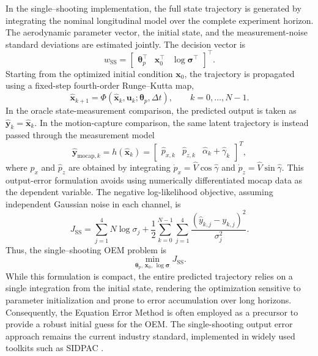 \documentclass[11pt]{article}
\begin{document}
In the single--shooting implementation, the full state trajectory is generated by
integrating the nominal longitudinal model over the complete experiment horizon.
The aerodynamic parameter vector, the initial state, and the measurement-noise
standard deviations are estimated jointly. The decision vector is
\[
    w_{\mathrm{SS}}
    =
    \begin{bmatrix}
        \boldsymbol{\theta}_p^\top &
        \mathbf{x}_0^\top &
        \log\boldsymbol{\sigma}^\top
    \end{bmatrix}^{\!\top}.
\]
Starting from the optimized initial condition $\mathbf{x}_0$, the trajectory is
propagated using a fixed-step fourth-order Runge--Kutta map,
\[
    \hat{\mathbf{x}}_{k+1}
    =
    \Phi(\hat{\mathbf{x}}_k,\mathbf{u}_k;\boldsymbol{\theta}_p,\Delta t),
    \qquad k=0,\ldots,N-1.
\]
In the oracle state-measurement comparison, the predicted output is
taken as $\hat{\mathbf{y}}_k=\hat{\mathbf{x}}_k$. In the motion-capture comparison,
the same latent trajectory is instead passed through the measurement model
\[
\hat{\mathbf{y}}_{\mathrm{mocap},k}
=h(\hat{\mathbf{x}}_k)
=
\begin{bmatrix}
\hat{p}_{x,k} & \hat{p}_{z,k} & \hat{\alpha}_k+\hat{\gamma}_k
\end{bmatrix}^{T},
\]
where $\hat{p}_x$ and $\hat{p}_z$ are obtained by integrating
$\dot{p}_x=\hat{V}\cos\hat{\gamma}$ and
$\dot{p}_z=\hat{V}\sin\hat{\gamma}$. This output-error formulation avoids
using numerically differentiated mocap data as the dependent variable. The negative log-likelihood
objective, assuming independent Gaussian noise in each channel, is
\[
    J_{\mathrm{SS}}
    =
    \sum_{j=1}^{4} N\log\sigma_j
    +
    \frac{1}{2}
    \sum_{k=0}^{N-1}
    \sum_{j=1}^{4}
    \frac{\left(\hat{y}_{k,j}-y_{k,j}\right)^2}{\sigma_j^2}.
\]
Thus, the single--shooting OEM problem is
\[
    \min_{\boldsymbol{\theta}_p,\,\mathbf{x}_0,\,\log\boldsymbol{\sigma}}
    J_{\mathrm{SS}}.
\]
While this formulation is compact, the entire predicted trajectory relies on a single integration from the initial state, rendering the optimization sensitive to parameter initialization and prone to error accumulation over long horizons. Consequently, the Equation Error Method is often employed as a precursor to provide a robust initial guess for the OEM. The single-shooting output error approach remains the current industry standard, implemented in widely used toolkits such as SIDPAC \cite{Morelli2002SIDPAC}.
\end{document}
